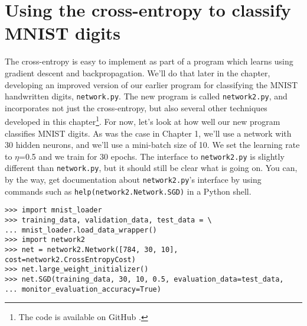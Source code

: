 \section{Using the cross-entropy to classify MNIST digits}
\label{sec:Usingthecross-entropytoclassifyMNISTdigits}

The cross-entropy is easy to implement as part of a program which learns using gradient descent and backpropagation. We'll do that later in the chapter, developing an improved version of our earlier program for classifying the MNIST handwritten digits, \lstinline{network.py}. The new program is called \lstinline{network2.py}, and incorporates not just the cross-entropy, but also several other techniques developed in this chapter\footnote{The code is available on GitHub \cite{Nielsengithub2019}.}. For now, let's look at how well our new program classifies MNIST digits. As was the case in Chapter 1, we'll use a network with 30 hidden neurons, and we'll use a mini-batch size of 10. We set the learning rate to $\eta$=0.5
and we train for 30 epochs. The interface to \lstinline{network2.py} is slightly different than \lstinline{network.py}, but it should still be clear what is going on. You can, by the way, get documentation about \lstinline{network2.py}'s interface by using commands such as \lstinline{help(network2.Network.SGD)} in a Python shell.

\begin{lstlisting}
>>> import mnist_loader
>>> training_data, validation_data, test_data = \
... mnist_loader.load_data_wrapper()
>>> import network2
>>> net = network2.Network([784, 30, 10], cost=network2.CrossEntropyCost)
>>> net.large_weight_initializer()
>>> net.SGD(training_data, 30, 10, 0.5, evaluation_data=test_data,
... monitor_evaluation_accuracy=True)
\end{lstlisting}


